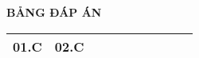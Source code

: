 \loigiai
{
	\begin{center}
		\textbf{BẢNG ĐÁP ÁN}
	\end{center}
	\begin{center}
		\begin{tabular}{|m{2.8em}|m{2.8em}|m{2.8em}|m{2.8em}|m{2.8em}|m{2.8em}|m{2.8em}|m{2.8em}|m{2.8em}|m{2.8em}|}
			\hline
			01.C  & 02.C  &   &   &   &   &  &  &  &  \\
			\hline
			
		\end{tabular}
	\end{center}
}


\whiteBGstarEnd
